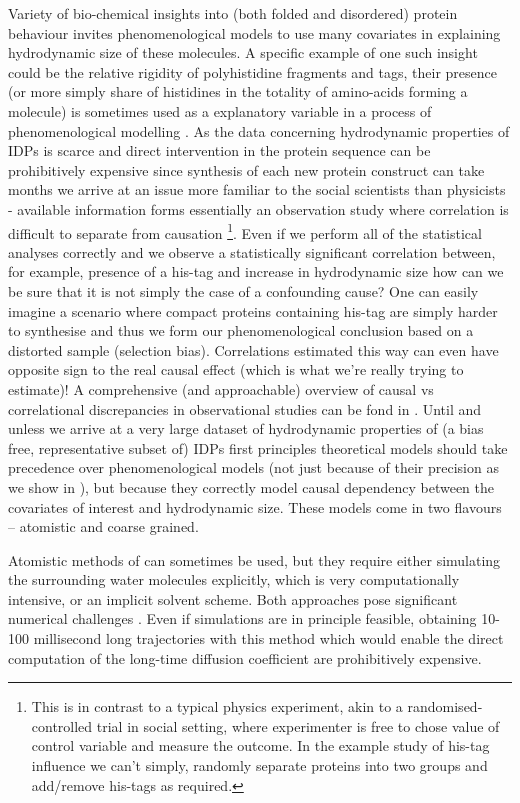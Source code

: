 \documentclass{doctoral}
\begin{document}
Variety of bio-chemical insights into (both folded and disordered) protein behaviour invites phenomenological models to use many covariates in explaining hydrodynamic size of these molecules.
A specific example of one such insight could be the relative rigidity of polyhistidine fragments and tags, their presence (or more simply share of histidines in the totality of amino-acids forming a molecule) is sometimes used as a explanatory variable in a process of phenomenological modelling \cite{Tomasso_2016,Marsh_2010}.
As the data concerning hydrodynamic properties of IDPs is scarce and direct intervention in the protein sequence can be prohibitively expensive since synthesis of each new protein construct can take months we arrive at an issue more familiar to the social scientists than physicists - available information forms essentially an observation study where correlation is difficult to separate from causation \footnote{This is in contrast to a typical physics experiment, akin to a randomised-controlled trial in social setting, where experimenter is free to chose value of control variable and measure the outcome.
    In the example study of his-tag influence we can't simply, randomly separate proteins into two groups and add/remove his-tags as required.
}.
Even if we perform all of the statistical analyses correctly and we observe a statistically significant correlation between, for example, presence of a his-tag and increase in hydrodynamic size how can we be sure that it is not simply the case of a confounding cause?
One can easily imagine a scenario where compact proteins containing his-tag are simply harder to synthesise and thus we form our phenomenological conclusion based on a distorted sample (selection bias).
Correlations estimated this way can even have opposite sign to the real causal effect (which is what we're really trying to estimate)!
A comprehensive (and approachable) overview of causal vs correlational discrepancies in observational studies can be fond in \textcite{Cinelli_2022}.
Until and unless we arrive at a very large dataset of hydrodynamic properties of (a bias free, representative subset of) IDPs first principles theoretical models should take precedence over phenomenological models (not just because of their precision as we show in \textcite{Waszkiewicz_2024_mda}), but because they correctly model causal dependency between the covariates of interest and hydrodynamic size.
These models come in two flavours -- atomistic and coarse grained.

Atomistic methods of can sometimes be used\cite{Karplus_1990}, but they require either simulating the surrounding water molecules explicitly, which is very computationally intensive, or an implicit solvent scheme.
Both approaches pose significant numerical challenges \cite{Frenkel_2001}.
Even if simulations are in principle feasible, obtaining 10-100 millisecond long trajectories with this method which would enable the direct computation of the long-time diffusion coefficient are prohibitively expensive.
\end{document}

